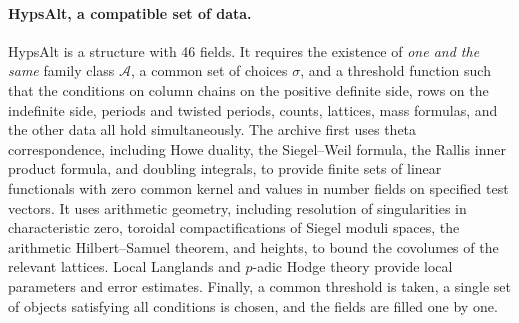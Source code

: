 \documentclass[11pt]{article}
\begin{document}
\paragraph{\textsf{HypsAlt}, a compatible set of data.} \textsf{HypsAlt} is a structure with 46 fields. It requires the existence of \emph{one and the same} family class $\mathcal A$, a common set of choices $\sigma$, and a threshold function such that the conditions on column chains on the positive definite side, rows on the indefinite side, periods and twisted periods, counts, lattices, mass formulas, and the other data all hold simultaneously. The archive first uses theta correspondence, including Howe duality, the Siegel--Weil formula, the Rallis inner product formula, and doubling integrals, to provide finite sets of linear functionals with zero common kernel and values in number fields on specified test vectors. It uses arithmetic geometry, including resolution of singularities in characteristic zero, toroidal compactifications of Siegel moduli spaces, the arithmetic Hilbert--Samuel theorem, and heights, to bound the covolumes of the relevant lattices. Local Langlands and $p$-adic Hodge theory provide local parameters and error estimates. Finally, a common threshold is taken, a single set of objects satisfying all conditions is chosen, and the fields are filled one by one.
\end{document}
